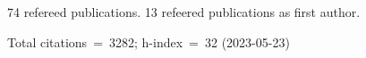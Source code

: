 74 refereed publications. 13 refeered publications as first author.

Total citations~=~3282; h-index~=~32 (2023-05-23)